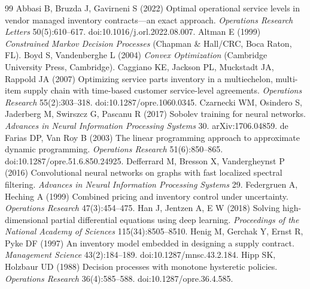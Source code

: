 \begin{thebibliography}{99}
Abbasi B, Bruzda J, Gavirneni S (2022) Optimal operational service levels in vendor managed inventory contracts---an exact approach. \emph{Operations Research Letters} 50(5):610--617. doi:10.1016/j.orl.2022.08.007.
Altman E (1999) \emph{Constrained Markov Decision Processes} (Chapman \& Hall/CRC, Boca Raton, FL).
Boyd S, Vandenberghe L (2004) \emph{Convex Optimization} (Cambridge University Press, Cambridge).
Caggiano KE, Jackson PL, Muckstadt JA, Rappold JA (2007) Optimizing service parts inventory in a multiechelon, multi-item supply chain with time-based customer service-level agreements. \emph{Operations Research} 55(2):303--318. doi:10.1287/opre.1060.0345.
Czarnecki WM, Osindero S, Jaderberg M, Swirszcz G, Pascanu R (2017) Sobolev training for neural networks. \emph{Advances in Neural Information Processing Systems} 30. arXiv:1706.04859.
de Farias DP, Van Roy B (2003) The linear programming approach to approximate dynamic programming. \emph{Operations Research} 51(6):850--865. doi:10.1287/opre.51.6.850.24925.
Defferrard M, Bresson X, Vandergheynst P (2016) Convolutional neural networks on graphs with fast localized spectral filtering. \emph{Advances in Neural Information Processing Systems} 29.
Federgruen A, Heching A (1999) Combined pricing and inventory control under uncertainty. \emph{Operations Research} 47(3):454--475.
Han J, Jentzen A, E W (2018) Solving high-dimensional partial differential equations using deep learning. \emph{Proceedings of the National Academy of Sciences} 115(34):8505--8510.
Henig M, Gerchak Y, Ernst R, Pyke DF (1997) An inventory model embedded in designing a supply contract. \emph{Management Science} 43(2):184--189. doi:10.1287/mnsc.43.2.184.
Hipp SK, Holzbaur UD (1988) Decision processes with monotone hysteretic policies. \emph{Operations Research} 36(4):585--588. doi:10.1287/opre.36.4.585.

\end{thebibliography}
